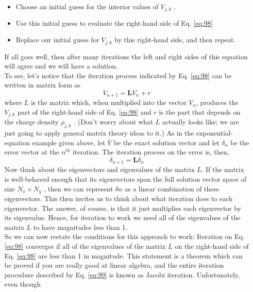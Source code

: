 \begin{itemize}
\item Choose an initial guess for the interior values of $V_{j,k}$ .
\item Use this initial guess to evaluate the right-hand side of Eq. \ref{eq:98}
\item Replace our initial guess for $V_{j,k}$ by this right-hand side, and then repeat.

\end{itemize}
If all goes well, then after many iterations the left and right sides of this equation will agree and we will have a solution. \\
To see, let\rq s notice that the iteration process indicated by Eq. \ref{eq:98} can be
written in matrix form as
\begin{equation}\label{eq:99}
V_{n+1}=\mathbf{L} V_{n}+r
\end{equation}
where $L$ is the matrix which, when multiplied into the vector $V_n$, produces the
$V_{j,k}$ part of the right-hand side of Eq. \ref{eq:98} and $r$ is the part that depends on the
charge density $ \rho_{j,k}$ . (Don\rq t worry about what $L$ actually looks like; we are just
going to apply general matrix theory ideas to it.) As in the exponential-equation
example given above, let $\bar{V}$ be the exact solution vector and let $\delta_n$ be the error
vector at the $n^{th}$ iteration. The iteration process on the error is, then,
\begin{equation}\label{eq:910}
\delta_{n+1}=\mathbf{L} \delta_{n}
\end{equation}
Now think about the eigenvectors and eigenvalues of the matrix $L$. If the matrix is
well-behaved enough that its eigenvectors span the full solution vector space of
size $N_x × N_y$ , then we can represent $\delta n$ as a linear combination of these eigenvectors. This then invites us to think about what iteration does to each eigenvector. The answer, of course, is that it just multiplies each eigenvector by its eigenvalue.
Hence, for iteration to work we need all of the eigenvalues of the matrix $L$ to have
magnitudes less than 1.\\
So we can now restate the conditions for this approach to work: Iteration on
Eq. \ref{eq:98} converges if all of the eigenvalues of the matrix $L$ on the right-hand side
of Eq. \ref{eq:98} are less than 1 in magnitude. This statement is a theorem which can be
proved if you are really good at linear algebra, and the entire iteration procedure
described by Eq. \ref{eq:99} is known as Jacobi iteration. Unfortunately, even though
